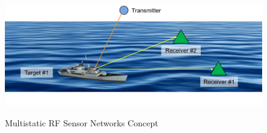 \begin{figure}[H]
  \begin{center}
\includegraphics[width=5in]{../media/multistatic/ms_rf_concept.png}
  \end{center}
  \renewcommand{\baselinestretch}{1} \small\normalsize
  \begin{quote}
    \caption[Multistatic RF Sensor Networks Concept]{Multistatic RF Sensor Networks Concept\label{ms_fig:1}}
  \end{quote}
\end{figure}
\renewcommand{\baselinestretch}{2} \small\normalsize
